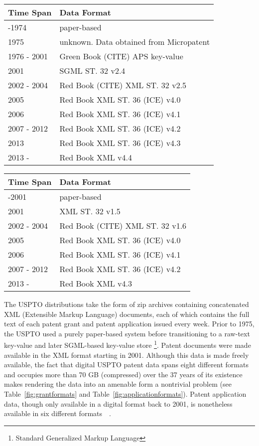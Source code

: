 \begin{table*}[t]
\center %
\begin{tabular}{|l|l|}
\hline 
Time Span  & Data Format \tabularnewline
\hline 
-1974  & paper-based \tabularnewline
1975  & unknown. Data obtained from Micropatent \tabularnewline
1976 - 2001  & Green Book (CITE) APS key-value \tabularnewline
2001  & SGML ST. 32 v2.4 \tabularnewline
2002 - 2004  & Red Book (CITE) XML ST. 32 v2.5 \tabularnewline
2005  & Red Book XML ST. 36 (ICE) v4.0 \tabularnewline
2006  & Red Book XML ST. 36 (ICE) v4.1 \tabularnewline
2007 - 2012  & Red Book XML ST. 36 (ICE) v4.2 \tabularnewline
2013  & Red Book XML ST. 36 (ICE) v4.3 \tabularnewline
2013 -  & Red Book XML v4.4 \tabularnewline
\hline 
\end{tabular}\caption{Table of USPTO grant data formats}


\label{fig:grantformats} 
\end{table*}
\begin{table*}[t]
\center %
\begin{tabular}{|l|l|}
\hline 
Time Span  & Data Format \tabularnewline
\hline 
-2001 & paper-based \tabularnewline
2001  & XML ST. 32 v1.5\tabularnewline
2002 - 2004  & Red Book (CITE) XML ST. 32 v1.6 \tabularnewline
2005 & Red Book XML ST. 36 (ICE) v4.0\tabularnewline
2006 & Red Book XML ST. 36 (ICE) v4.1 \tabularnewline
2007 - 2012 & Red Book XML ST. 36 (ICE) v4.2 \tabularnewline
2013 -  & Red Book XML v4.3\tabularnewline
\hline 
\end{tabular}\caption{Table of USPTO grant data formats}


\label{fig:applicationformats} 
\end{table*}


The USPTO distributions take the form of zip archives containing concatenated
XML (Extensible Markup Language) documents, each of which contains
the full text of each patent grant and patent application issued every
week. Prior to 1975, the USPTO used a purely paper-based system before
transitioning to a raw-text key-value and later SGML-based key-value
store %
\footnote{Standard Generalized Markup Language%
}. Patent documents were made available in the XML format starting
in 2001. Although this data is made freely available, the fact that
digital USPTO patent data spans eight different formats and occupies
more than 70 GB (compressed) over the 37 years of its existence makes
rendering the data into an amenable form a nontrivial problem (see
Table~\ref{fig:grantformats} and Table~\ref{fig:applicationformats}).
Patent application data, though only available in a digital format
back to 2001, is nonetheless available in six different formats~\cite{xmlresources}~\cite{xmlretrospective}.
